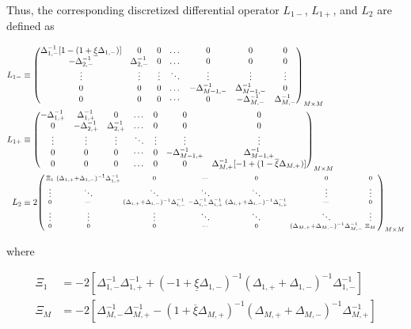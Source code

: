 \documentclass[11pt]{article}
\newenvironment{psmallmatrix}
{\left(\begin{smallmatrix}}
	{\end{smallmatrix}\right)}
\theoremstyle{definition}
\begin{document}
Thus, the corresponding discretized differential operator $L_{1-}$, $L_{1+}$, and $L_2$ are defined as 

\begin{align}
L_{1-} &\equiv \begin{pmatrix}
\Delta^{-1}_{1,-} [1 - (1 + \underline{\xi} \Delta_{1,-})] &0&0&\dots&0&0&0\\
-\Delta_{2,-}^{-1}&\Delta_{2,-}^{-1}&0&\dots&0&0&0\\
\vdots&\vdots&\vdots&\ddots&\vdots&\vdots&\vdots\\
0&0&0&\dots&-\Delta_{M-1,-}^{-1}&\Delta_{M-1,-}^{-1}&0\\
0&0&0&\cdots&0&-\Delta_{M,-}^{-1}&\Delta_{M,-}^{-1}
\end{pmatrix}_{M\times M}\label{eq:L-1} \\
L_{1+} &\equiv \begin{pmatrix}
-\Delta_{1,+}^{-1}&\Delta_{1,+}^{-1}&0&\dots&0&0&0\\
0&-\Delta_{2,+}^{-1}&\Delta_{2,+}^{-1}&\dots&0&0&0\\
\vdots&\vdots&\vdots&\ddots&\vdots&\vdots&\vdots\\
0&0&0&\cdots&0&-\Delta_{M-1,+}^{-1}&\Delta_{M-1,+}^{-1}\\
0&0&0&\dots&0&0&\Delta_{M,+}^{-1}  [-1 + (1 - \overline{\xi} \Delta_{M,+})]  \\
\end{pmatrix}_{M\times M}\label{eq:L-1-plus} \\
L_2 &\equiv 2 \begin{psmallmatrix}
\Xi_1 &
(\Delta_{1,+}+\Delta_{1,-})^{-1} \Delta_{1,+}^{-1}
&0&\cdots&0&0&0 \\
\vdots&\ddots&\ddots&\ddots&\ddots&\vdots&\vdots\\
0&\cdots&
(\Delta_{i,+}+\Delta_{i,-})^{-1} \Delta_{i,-}^{-1} &
-\Delta_{i,-}^{-1} \Delta_{i,+}^{-1}  & 
(\Delta_{i,+}+\Delta_{i,-})^{-1} \Delta_{i,+}^{-1}&\cdots&0 \\
\vdots&\vdots&\vdots&\ddots&\ddots&\ddots&\vdots\\
0&0&0&\cdots&0&(\Delta_{M,+}+\Delta_{M,-})^{-1} \Delta_{M,-}^{-1}&\Xi_M
\end{psmallmatrix}_{M\times M}\label{eq:L-2} 
\end{align}

where

\begin{align}
\Xi_{1} &= -2\left[  \Delta_{1,-}^{-1} \Delta_{1,+}^{-1} + (-1 + \underline{\xi} \Delta_{1,-})^{-1} (\Delta_{1,+} + \Delta_{1,-})^{-1}  \Delta_{1,-}^{-1} \right] \\
\Xi_{M} &= -2\left[  \Delta_{M,-}^{-1} \Delta_{M,+}^{-1} - (1 + \overline{\xi} \Delta_{M,+})^{-1} (\Delta_{M,+} + \Delta_{M,-})^{-1}  \Delta_{M,+}^{-1} \right]
\end{align}
\end{document}
